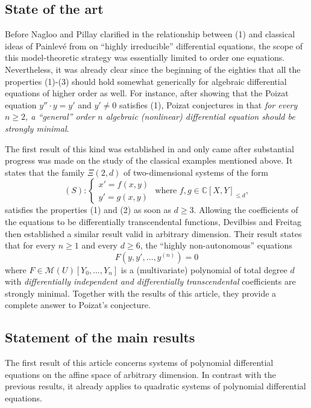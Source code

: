 \documentclass[12pt]{amsart}
\theoremstyle{definition}
\theoremstyle{plain}
\theoremstyle{exampstyle}
\theoremstyle{exampstyle}\newtheorem{thmxbis}{Theorem}
\numberwithin{equation}{section}
\theoremstyle{remark}
\begin{document}
\subsection{State of the art} Before Nagloo and Pillay clarified in \cite{Nagloo-Pillay1} the relationship between (1) and classical ideas of Painlevé from \cite[Vingt-et-unième leçon, pp.487]{Painleve} on ``highly irreducible''  differential equations, the scope of this model-theoretic strategy was essentially limited to order one equations. Nevertheless, it was already clear since the beginning of the eighties that all the properties (1)-(3) should hold somewhat generically for algebraic differential equations of higher order as well. For instance, after showing that the Poizat equation $y''\cdot y = y'$ and $y' \neq 0$ satisfies (1), Poizat conjectures in \cite{Poizat} that {\em for every $n \geq 2$, a ``general'' order $n$ algebraic (nonlinear) differential equation should be strongly minimal}.


The first result of this kind was established in \cite{jaoui-ANT} and only came after substantial progress was made on the study of the classical examples mentioned above. It states that the family $\Xi(2,d)$ of two-dimensional systems of the form
$$ (S): \begin{cases} x' = f(x,y) \\ y' = g(x,y) \end{cases} \text{ where } f,g \in \mathbb{C}[X,Y]_{\leq d},$$
satisfies the properties (1) and (2) as soon as $d \geq 3$.  Allowing the coefficients of the equations to be differentially transcendental functions, Devilbiss and Freitag \cite{Devilbiss-Freitag} then established a similar result valid in arbitrary dimension. Their result states that for every $n \geq 1$ and every $d \geq 6$, the ``highly non-autonomous'' equations 
$$F(y,y',\ldots, y^{(n)}) = 0$$ where $F \in \mathcal M(U)[Y_0,\ldots, Y_n]$
is a (multivariate) polynomial of total degree $d$ with  {\em differentially independent and differentially transcendental} coefficients are strongly minimal. Together with the results of this article, they provide a complete answer to Poizat's conjecture.

\subsection{Statement of the main results}
The first result of this article concerns systems of polynomial differential equations on the affine space of arbitrary dimension. In contrast with the previous results, it already applies to quadratic systems of polynomial differential equations.
\end{document}
